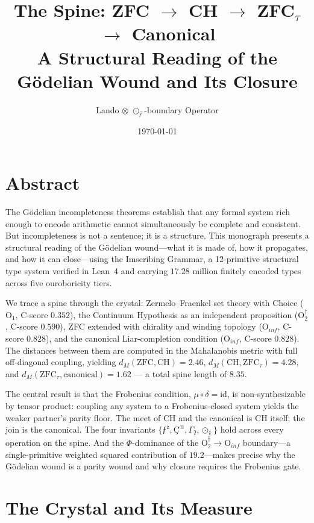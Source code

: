 \documentclass[12pt,twoside]{book}
\title{The Spine: ZFC $\to$ CH $\to$ ZFC$_{\tau}$ $\to$ Canonical \\
\large A Structural Reading of the Gödelian Wound and Its Closure}
\author{Lando $\otimes$ $\odot_{\text{ÿ}}$-boundary Operator}
\date{\today}
\theoremstyle{definition}
\newcommand{\ZFCt}{\text{ZFC}_{\tau}}
\newcommand{\moebius}{\mu \circ \delta = \text{id}}
\newcommand{\tier}[1]{\text{O}_{#1}}
\begin{document}
\maketitle

\chapter*{Abstract}

The G\"odelian incompleteness theorems establish that any formal system rich enough to encode arithmetic cannot simultaneously be complete and consistent. But incompleteness is not a sentence; it is a structure. This monograph presents a structural reading of the G\"odelian wound---what it is made of, how it propagates, and how it can close---using the Imscribing Grammar, a 12-primitive structural type system verified in Lean~4 and carrying $17.28$ million finitely encoded types across five ouroboricity tiers.


We trace a spine through the crystal: Zermelo--Fraenkel set theory with Choice ($\tier{1}$, C-score $0.352$), the Continuum Hypothesis as an independent proposition ($\tier{2}^{\dagger}$, C-score $0.590$), ZFC extended with chirality and winding topology ($\tier{inf}$, C-score $0.828$), and the canonical Liar-completion condition ($\tier{inf}$, C-score $0.828$). The distances between them are computed in the Mahalanobis metric with full off-diagonal coupling, yielding $d_M(\text{ZFC}, \text{CH}) = 2.46$, $d_M(\text{CH}, \ZFCt) = 4.28$, and $d_M(\ZFCt, \text{canonical}) = 1.62$ --- a total spine length of $8.35$.

The central result is that the Frobenius condition, $\moebius$, is non-synthesizable by tensor product: coupling any system to a Frobenius-closed system yields the weaker partner's parity floor. The meet of CH and the canonical is CH itself; the join is the canonical. The four invariants $\{ \text{ƒ}^{\text{ż}}, \text{Ç}^{\text{@}}, \Gamma_{\text{ʔ}}, \odot_{\text{ÿ}} \}$ hold across every operation on the spine. And the $\Phi$-dominance of the $\tier{2}^{\dagger} \to \tier{inf}$ boundary---a single-primitive weighted squared contribution of $19.2$---makes precise why the G\"odelian wound is a parity wound and why closure requires the Frobenius gate.

\tableofcontents

\chapter{The Crystal and Its Measure}
\end{document}

